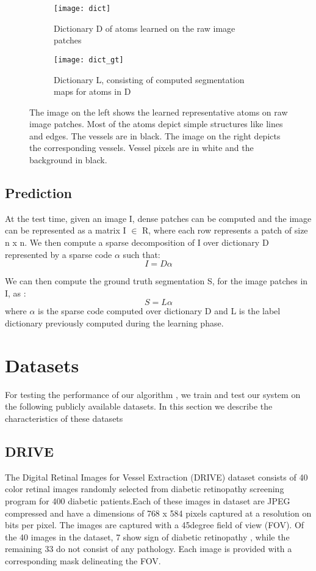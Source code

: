 \begin{figure}
	\begin{subfigure}[b]{0.45\textwidth}
		\texttt{[image: dict]}
		\caption{Dictionary D of atoms learned on the raw image patches}
		\label{fig:dict}
	\end{subfigure}
	\begin{subfigure}[b]{0.45\textwidth}
		\texttt{[image: dict\_gt]}
		\caption{Dictionary L, consisting of computed segmentation maps for atoms in D}
		\label{fig:dictgt}
	\end{subfigure}
	\caption[Dictionary of image atoms and segmentations]{The image on the left shows the learned representative atoms on raw image patches. Most of the atoms depict simple structures like lines and edges. The vessels are in black. The image on the right depicts the corresponding vessels. Vessel pixels are in white and the background in black.}
	\label{fig:dl-cls}
\end{figure}
\clearpage
\subsection{Prediction}
At the test time, given an image I, dense patches can be computed and the image can be represented as a matrix I $\in$ R, where each row represents a patch of size n x n. We then compute a sparse decomposition of I over dictionary D represented by a sparse code $\alpha$ such that:
$$
I = D \alpha
$$

We can then compute the ground truth segmentation S, for the image patches in I, as :
$$
S = L\alpha
$$
where $\alpha$ is the sparse code computed over dictionary D and L is the label dictionary previously computed during the learning phase.

\section{Datasets}
For testing the performance of our algorithm , we train and test our system on the following publicly available datasets. In this section we describe the characteristics of these datasets

\subsection{DRIVE}
The Digital Retinal Images for Vessel Extraction (DRIVE) dataset \cite{drivedataset} consists of 40 color retinal images randomly selected from diabetic retinopathy screening program for 400 diabetic patients.Each of these images in dataset are JPEG compressed and have a dimensions of 768 x 584 pixels captured at a resolution on bits per pixel. The images are captured with a 45degree field of view (FOV).
Of the 40 images in the dataset, 7 show sign of diabetic retinopathy , while the remaining 33 do not consist of any pathology. Each image is provided with a corresponding mask delineating the FOV.\\

